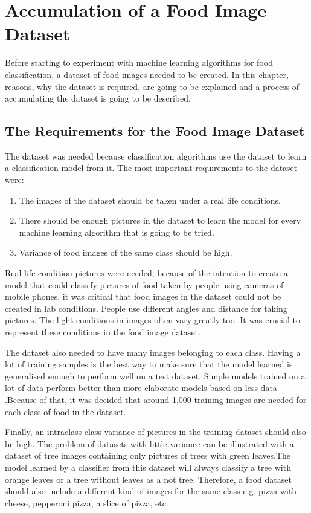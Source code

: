 \chapter{Accumulation of a Food Image Dataset}

Before starting to experiment with machine learning algorithms for food classification, a dataset of food images needed to be created. In this chapter, reasons, why the dataset is required, are going to be explained and a process of accumulating the dataset is going to be described.

\section{The Requirements for the Food Image Dataset}
 The dataset was needed because classification algorithms use the dataset to learn a classification model from it. The most important requirements to the dataset were:

\begin{enumerate}
  \item The images of the dataset should be taken under a real life conditions.
  \item There should be enough pictures in the dataset to learn the model for every machine learning algorithm that is going to be tried.
  \item Variance of food images of the same class should be high. 
\end{enumerate}

Real life condition pictures were needed, because of the intention to create a model that could classify pictures of food taken by people using cameras of mobile phones, it was critical that food images in the dataset could not be created in lab conditions. People use different angles and distance for taking pictures. The light conditions in images often vary greatly too. It was crucial to represent these conditions in the food image dataset.

The dataset also needed to have many images belonging to each class. Having a lot of training samples is the best way to make sure that the model learned is generalised enough to perform well on a test dataset. Simple models trained on a lot of data perform better than more elaborate models based on less data \citep{unreasonable}.Because of that, it was decided that around 1,000 training images are needed for each class of food in the dataset. 

Finally, an intraclass class variance of pictures in the training dataset should also be high. The problem of datasets with little variance can be illustrated with a dataset of tree images containing only pictures of trees with green leaves.The model learned by a classifier from this dataset will always classify a tree with orange leaves or a tree without leaves as a not tree. Therefore, a food dataset should also include a different kind of images for the same class e.g. pizza with cheese, pepperoni pizza, a slice of pizza, etc. 

